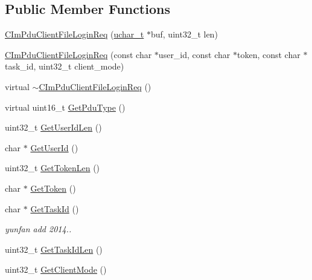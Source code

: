 \subsection*{Public Member Functions}
\begin{DoxyCompactItemize}
\item 
\hyperlink{class_c_im_pdu_client_file_login_req_a7d130773fe92eb4d6f036fc1ccce592c}{C\+Im\+Pdu\+Client\+File\+Login\+Req} (\hyperlink{base_2ostype_8h_a124ea0f8f4a23a0a286b5582137f0b8d}{uchar\+\_\+t} $\ast$buf, uint32\+\_\+t len)
\item 
\hyperlink{class_c_im_pdu_client_file_login_req_ad7f7a8c3aad1036132a83e19aa5e1bb6}{C\+Im\+Pdu\+Client\+File\+Login\+Req} (const char $\ast$user\+\_\+id, const char $\ast$token, const char $\ast$task\+\_\+id, uint32\+\_\+t client\+\_\+mode)
\item 
virtual \hyperlink{class_c_im_pdu_client_file_login_req_a379003eb75a8636f818cfe897dc3e228}{$\sim$\+C\+Im\+Pdu\+Client\+File\+Login\+Req} ()
\item 
virtual uint16\+\_\+t \hyperlink{class_c_im_pdu_client_file_login_req_ae450a33874dc58eb1d53e9024a053037}{Get\+Pdu\+Type} ()
\item 
uint32\+\_\+t \hyperlink{class_c_im_pdu_client_file_login_req_a636cc38faf64451626b08be13fefa711}{Get\+User\+Id\+Len} ()
\item 
char $\ast$ \hyperlink{class_c_im_pdu_client_file_login_req_aa48495a41f523886d6da17c406ecf90c}{Get\+User\+Id} ()
\item 
uint32\+\_\+t \hyperlink{class_c_im_pdu_client_file_login_req_a351da5823074b486097ea5158ae20139}{Get\+Token\+Len} ()
\item 
char $\ast$ \hyperlink{class_c_im_pdu_client_file_login_req_a37f92dd5d307bc6db86d97983c1d9f08}{Get\+Token} ()
\item 
char $\ast$ \hyperlink{class_c_im_pdu_client_file_login_req_a8e69972b6fec19bfaae3f301d07de688}{Get\+Task\+Id} ()
\begin{DoxyCompactList}\small\item\em yunfan add 2014.. \end{DoxyCompactList}\item 
uint32\+\_\+t \hyperlink{class_c_im_pdu_client_file_login_req_ad5c8f4ebf7331563608da4275d9a914e}{Get\+Task\+Id\+Len} ()
\item 
uint32\+\_\+t \hyperlink{class_c_im_pdu_client_file_login_req_af9649e38c653c6dd76f8274e906f5471}{Get\+Client\+Mode} ()
\end{DoxyCompactItemize}
